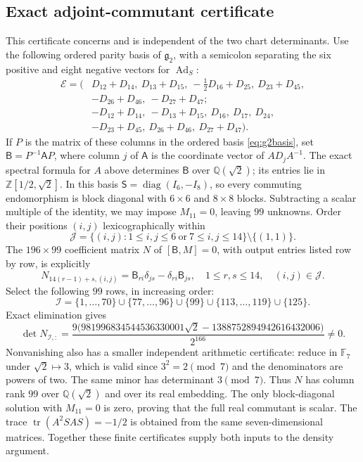 \documentclass[11pt,a4paper]{article}
\newcommand{\Ad}{\operatorname{Ad}}
\begin{document}
\subsection{Exact adjoint-commutant certificate}\label{app:density-certificate}
This certificate concerns  and is independent of the two chart determinants.
Use the following ordered parity basis of $\mathfrak g_2$, with a semicolon separating the six positive and eight negative vectors for $\Ad_S$:
\[
\begin{split}
\mathcal E=(&D_{12}+D_{14},\ D_{13}+D_{15},\ -\tfrac12D_{16}+D_{25},\ D_{23}+D_{45},\\
 &-D_{26}+D_{46},\ -D_{27}+D_{47};\\
 &-D_{12}+D_{14},\ -D_{13}+D_{15},\ D_{16},\ D_{17},\ D_{24},\\
 &-D_{23}+D_{45},\ D_{26}+D_{46},\ D_{27}+D_{47}).
\end{split}
\]
If $P$ is the matrix of these columns in the ordered basis \eqref{eq:g2basis}, set
$\mathsf B=P^{-1}\mathsf A P$, where column $j$ of $\mathsf A$ is the coordinate vector of $AD_jA^{-1}$.
The exact spectral formula for $A$ above determines $\mathsf B$ over $\mathbb Q(\sqrt2)$; its entries lie in $\mathbb Z[1/2,\sqrt2]$.
In this basis $\mathsf S=\operatorname{diag}(I_6,-I_8)$, so every commuting endomorphism is block diagonal with $6\times6$ and $8\times8$ blocks.
Subtracting a scalar multiple of the identity, we may impose $M_{11}=0$, leaving $99$ unknowns.
Order their positions $(i,j)$ lexicographically within
\[
\mathcal J=\{(i,j):1\le i,j\le6\ \text{or}\ 7\le i,j\le14\}\setminus\{(1,1)\}.
\]
The $196\times99$ coefficient matrix $N$ of $[\mathsf B,M]=0$, with output entries listed row by row, is explicitly
\[
N_{14(r-1)+s,(i,j)}=\mathsf B_{ri}\delta_{js}-\delta_{ri}\mathsf B_{js},
\quad 1\le r,s\le14,\quad (i,j)\in\mathcal J.
\]
Select the following $99$ rows, in increasing order:
\[
\mathcal I=\{1,\ldots,70\}\cup\{77,\ldots,96\}\cup\{99\}
 \cup\{113,\ldots,119\}\cup\{125\}.
\]
Exact elimination gives
\[
\det N_{\mathcal I,:}
=\frac{9\bigl(981996834544536330001\sqrt2-1388752894942616432006\bigr)}{2^{166}}
\ne0.
\]
Nonvanishing also has a smaller independent arithmetic certificate: reduce in $\mathbb F_7$ under $\sqrt2\mapsto3$, which is valid since $3^2=2\pmod7$ and the denominators are powers of two.  The same minor has determinant $3\pmod7$.
Thus $N$ has column rank $99$ over $\mathbb Q(\sqrt2)$ and over its real embedding.  The only block-diagonal solution with $M_{11}=0$ is zero, proving that the full real commutant is scalar.
The trace $\operatorname{tr}(A^2SAS)=-1/2$ is obtained from the same seven-dimensional matrices.  Together these finite certificates supply both inputs to the density argument.
\end{document}
